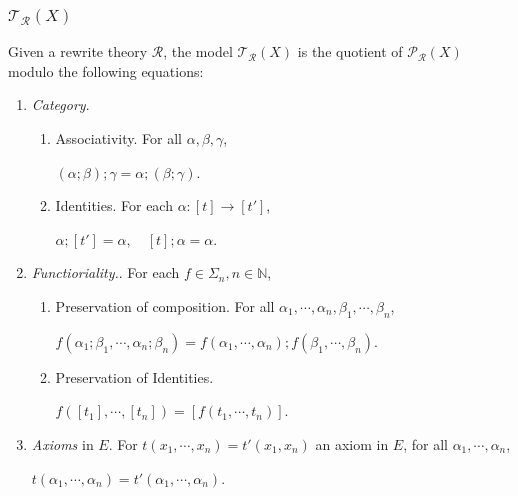\documentclass{beamer}
\begin{document}
\begin{frame}[allowframebreaks]
    \scriptsize
    \frametitle{$\mathcal{T_R}(X)$}
    Given a rewrite theory $\mathcal{R}$, the model $\mathcal{T_R}(X)$ is the quotient of 
    $\mathcal{P_R}(X)$ modulo the following equations:
    
    \begin{enumerate}
        \item \emph{Category}.
        \begin{enumerate}[a]
            \scriptsize
            \item Associativity. For all $\alpha,\beta,\gamma$,
            
            $(\alpha;\beta);\gamma = \alpha;(\beta;\gamma).$
            \item Identities. For each $\alpha: [t] \rightarrow [t']$,
            
            $\alpha;[t'] = \alpha,\quad [t];\alpha=\alpha.$
        \end{enumerate}
        \item \emph{Functioriality.}. For each $f \in \Sigma_n, n \in \mathbb{N}$,
        \begin{enumerate}[a]
            \scriptsize
            \item Preservation of composition. For all $\alpha_1,\cdots,\alpha_n,\beta_1,\cdots,\beta_n$,
            
            $f(\alpha_1;\beta_1,\cdots,\alpha_n;\beta_n) = f(\alpha_1,\cdots,\alpha_n);f(\beta_1,\cdots,\beta_n). $
            \item Preservation of Identities.
            
            $ f([t_1],\cdots,[t_n])=[f(t_1,\cdots,t_n)].$
        \end{enumerate}
        \item \emph{Axioms} in $E$. For $t(x_1,\cdots,x_n)=t'(x_1,x_n)$ an axiom in $E$, for all $\alpha_1,\cdots,\alpha_n$,
        
        $ t(\alpha_1,\cdots,\alpha_n)=t'(\alpha_1,\cdots,\alpha_n).$


\end{enumerate}
\end{frame}
\end{document}
